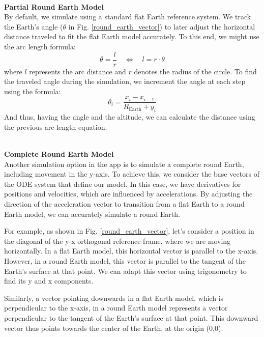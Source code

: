 \documentclass[runningheads]{llncs}
\begin{document}
\textbf{\\Partial Round Earth Model\\}
By default, we simulate using a standard flat Earth reference system. We track the Earth's angle (\(\theta\) in Fig. \ref{round_earth_vector}) to later adjust the horizontal distance traveled to fit the flat Earth model accurately. To this end, we might use the arc length formula:
\begin{equation}
    \theta = \frac{l}{r} \quad \Leftrightarrow \quad l = r \cdot \theta
\end{equation}
where \( l \) represents the arc distance and \( r \) denotes the radius of the circle. To find the traveled angle during the simulation, we increment the angle at each step using the formula:
\begin{equation}
    \theta_i = \frac{x_i - x_{i-1}}{R_{\text{Earth}} + y_i}
\end{equation}
And thus, having the angle and the altitude, we can calculate the distance using the previous arc length equation.

\textbf{\\Complete Round Earth Model\\}
Another simulation option in the app is to simulate a complete round Earth, including movement in the y-axis. To achieve this, we consider the base vectors of the ODE system that define our model. In this case, we have derivatives for positions and velocities, which are influenced by accelerations. By adjusting the direction of the acceleration vector to transition from a flat Earth to a round Earth model, we can accurately simulate a round Earth.

For example, as shown in Fig. \ref{round_earth_vector}, let's consider a position in the diagonal of the y-x orthogonal reference frame, where we are moving horizontally. In a flat Earth model, this horizontal vector is parallel to the x-axis. However, in a round Earth model, this vector is parallel to the tangent of the Earth's surface at that point. We can adapt this vector using trigonometry to find its y and x components.

Similarly, a vector pointing downwards in a flat Earth model, which is perpendicular to the x-axis, in a round Earth model represents a vector perpendicular to the tangent of the Earth's surface at that point. This downward vector thus points towards the center of the Earth, at the origin (0,0).
\end{document}
